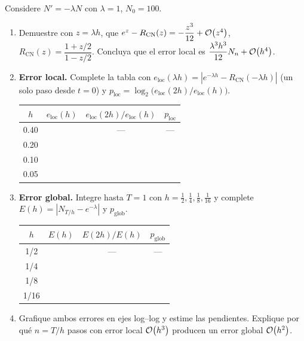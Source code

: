 
\begin{enunciado}
	Considere $N' = -\lambda N$ con $\lambda = 1$, $N_0 = 100$.
	\begin{enumerate}[label=(\alph*)]
		\item Demuestre con $z = \lambda h$, que
		$e^{z} - R_{\mathrm{CN}}(z) = -\dfrac{z^3}{12} + \mathcal{O}\!\left(z^4\right)$,
		$R_{\mathrm{CN}}(z) = \dfrac{1 + z/2}{1 - z/2}$.
		Concluya que el error local es $\dfrac{\lambda^3 h^3}{12} N_n + \mathcal{O}\!\left(h^4\right)$.
		\item \textbf{Error local.} Complete la tabla con
		$e_{\mathrm{loc}}(\lambda h) = \left| e^{-\lambda h} - R_{\mathrm{CN}}(-\lambda h)\right|$
		(un solo paso desde $t = 0$) y
		$p_{\mathrm{loc}} = \log_2\!\big(e_{\mathrm{loc}}(2h)/e_{\mathrm{loc}}(h)\big)$.
		
		\begin{center}
			\begin{tabular}{cccc}\toprule
				$h$ & $e_{\mathrm{loc}}(h)$ & $e_{\mathrm{loc}}(2h)/e_{\mathrm{loc}}(h)$ & $p_{\mathrm{loc}}$\\\midrule
				0.40 & & --- & --- \\ 0.20 & & & \\ 0.10 & & & \\ 0.05 & & & \\\bottomrule
			\end{tabular}
		\end{center}
		\item \textbf{Error global.} Integre hasta $T = 1$ con $h = \tfrac12, \tfrac14, \tfrac18, \tfrac1{16}$
		y complete $E(h) = |N_{T/h} - e^{-\lambda}|$ y $p_{\mathrm{glob}}$.

		\begin{center}
			\begin{tabular}{cccc}\toprule
				$h$ & $E(h)$ & $E(2h)/E(h)$ & $p_{\mathrm{glob}}$\\\midrule
				1/2 & & --- & --- \\ 1/4 & & & \\ 1/8 & & & \\ 1/16 & & & \\\bottomrule
			\end{tabular}
		\end{center}
		\item Grafique ambos errores en ejes log--log y estime las pendientes. Explique por qué
		$n = T/h$ pasos con error local $\mathcal{O}\!\left(h^3\right)$ producen un error global $\mathcal{O}\!\left(h^2\right)$.
	\end{enumerate}
\end{enunciado}

